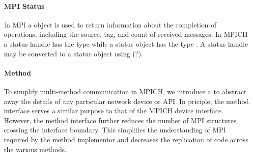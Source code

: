 
\paragraph{MPI Status}

In MPI a  object is used to return information about the
completion of operations, including the source, tag, and count of received
messages.  In MPICH a status handle has the type  while a
status object has the type .  A status handle may be
converted to a status object using  (?).

\begin{comment}[ROB]
What else do we want to say about MPI Status?
\end{comment}


\paragraph{Method}


To simplify multi-method communication in MPICH, we introduce a
 to abstract away the details of any particular
network device or API.  In priciple, the method interface serves a similar
purpose to that of the MPICH device interface.  However, the method interface
further reduces the number of MPI structures crossing the interface boundary.
This simplifies the understanding of MPI required by the method implementor and
decreases the replication of code across the various methods.

